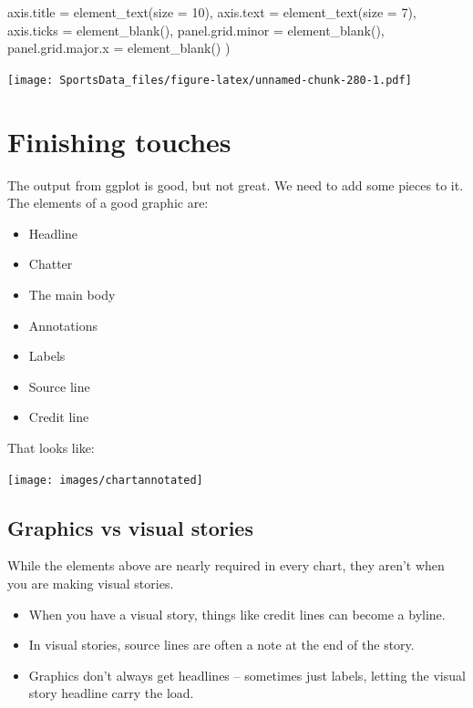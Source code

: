 \documentclass[
]{book}
\newenvironment{Shaded}{\begin{snugshade}}{\end{snugshade}}
\newcommand{\AttributeTok}[1]{\textcolor[rgb]{0.77,0.63,0.00}{#1}}
\newcommand{\DecValTok}[1]{\textcolor[rgb]{0.00,0.00,0.81}{#1}}
\newcommand{\FunctionTok}[1]{\textcolor[rgb]{0.00,0.00,0.00}{#1}}
\newcommand{\NormalTok}[1]{#1}
\providecommand{\tightlist}{%
  \setlength{\itemsep}{0pt}\setlength{\parskip}{0pt}}
\begin{document}
\begin{Shaded}
\begin{Highlighting}[]
    \AttributeTok{axis.title =} \FunctionTok{element\_text}\NormalTok{(}\AttributeTok{size =} \DecValTok{10}\NormalTok{),}
    \AttributeTok{axis.text =} \FunctionTok{element\_text}\NormalTok{(}\AttributeTok{size =} \DecValTok{7}\NormalTok{),}
    \AttributeTok{axis.ticks =} \FunctionTok{element\_blank}\NormalTok{(),}
    \AttributeTok{panel.grid.minor =} \FunctionTok{element\_blank}\NormalTok{(),}
    \AttributeTok{panel.grid.major.x =} \FunctionTok{element\_blank}\NormalTok{()}
\NormalTok{  )}
\end{Highlighting}
\end{Shaded}

\texttt{[image: SportsData\_files/figure-latex/unnamed-chunk-280-1.pdf]}

\hypertarget{finishing-touches}{%
\chapter{Finishing touches}\label{finishing-touches}}

The output from ggplot is good, but not great. We need to add some pieces to it. The elements of a good graphic are:

\begin{itemize}
\tightlist
\item
  Headline
\item
  Chatter
\item
  The main body
\item
  Annotations
\item
  Labels
\item
  Source line
\item
  Credit line
\end{itemize}

That looks like:

\texttt{[image: images/chartannotated]}

\hypertarget{graphics-vs-visual-stories}{%
\section{Graphics vs visual stories}\label{graphics-vs-visual-stories}}

While the elements above are nearly required in every chart, they aren't when you are making visual stories.

\begin{itemize}
\tightlist
\item
  When you have a visual story, things like credit lines can become a byline.
\item
  In visual stories, source lines are often a note at the end of the story.
\item
  Graphics don't always get headlines -- sometimes just labels, letting the visual story headline carry the load.
\end{itemize}
\end{document}
